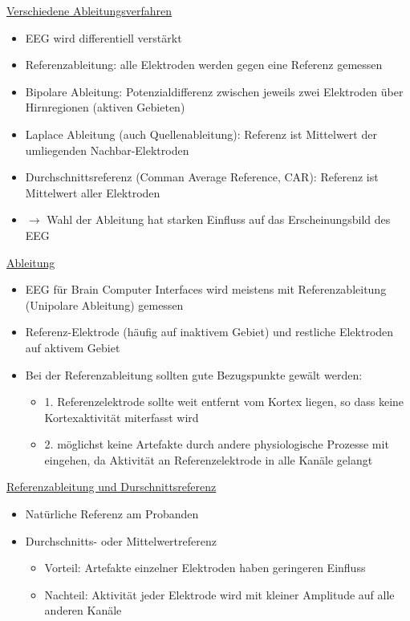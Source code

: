 \documentclass[a4paper,10pt,oneside]{article}
\begin{document}
\underline{Verschiedene Ableitungsverfahren} \\
	\begin{itemize}
		\item EEG wird differentiell verstärkt
		\item Referenzableitung: alle Elektroden werden gegen eine Referenz gemessen
		\item Bipolare Ableitung: Potenzialdifferenz zwischen jeweils zwei Elektroden über Hirnregionen (aktiven Gebieten)
		\item Laplace Ableitung (auch Quellenableitung): Referenz ist Mittelwert der umliegenden Nachbar-Elektroden
		\item Durchschnittsreferenz (Comman Average Reference, CAR): Referenz ist Mittelwert aller Elektroden
		\item $\rightarrow$ Wahl der Ableitung hat starken Einfluss auf das Erscheinungsbild des EEG
	\end{itemize}
	
\underline{Ableitung}\\
	\begin{itemize}
		\item EEG für Brain Computer Interfaces wird meistens mit Referenzableitung (Unipolare Ableitung) gemessen 
		\item Referenz-Elektrode (häufig auf inaktivem Gebiet) und restliche Elektroden auf aktivem Gebiet
		\item Bei der Referenzableitung sollten gute Bezugspunkte gewält werden:
			\begin{itemize}
				\item 1. Referenzelektrode sollte weit entfernt vom Kortex liegen, so dass keine Kortexaktivität miterfasst wird
				\item 2. möglichst keine Artefakte durch andere physiologische Prozesse mit eingehen, da Aktivität an Referenzelektrode in alle Kanäle gelangt
			\end{itemize}
	\end{itemize}
	
\underline{Referenzableitung und Durschnittsreferenz} \\
	\begin{itemize}
		\item Natürliche Referenz am Probanden
		\item Durchschnitts- oder Mittelwertreferenz
			\begin{itemize}
				\item Vorteil: Artefakte einzelner Elektroden haben geringeren Einfluss
				\item Nachteil: Aktivität jeder Elektrode wird mit kleiner Amplitude auf alle anderen Kanäle
			\end{itemize}
	\end{itemize}
 		
\end{document}
